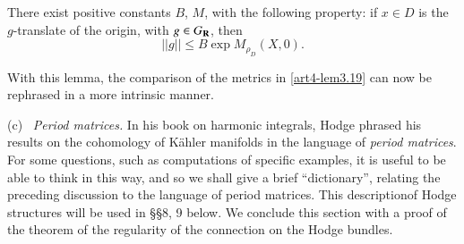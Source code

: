 \begin{lemma}\label{art4-lem3.23}
There exist positive constants $B$, $M$, with the following property: if $x \in D$ is the $g$-translate of the origin, with $g \in G_{\mathbf{R}}$, then
$$
||g|| \leqslant B \exp M_{\rho_D} (X,0).
$$
\end{lemma}

With this lemma, the comparison of the metrics in \eqref{art4-lem3.19} can now be rephrased in a more intrinsic manner.

\medskip
\noindent
(c)~ \textit{Period matrices.} In his book \cite{art4-key30} on harmonic integrals, Hodge phrased his results on the cohomology of K\"ahler manifolds in the language of \textit{period matrices}. For some questions, such as computations of specific examples, it is useful to be able to think in this way, and so we shall give a brief ``dictionary'', relating the preceding discussion to the language of period matrices. This description\pageoriginale of Hodge structures will be used in \S \S 8, 9 below. We conclude this section with a proof of the theorem of the regularity of the connection on the Hodge bundles.

